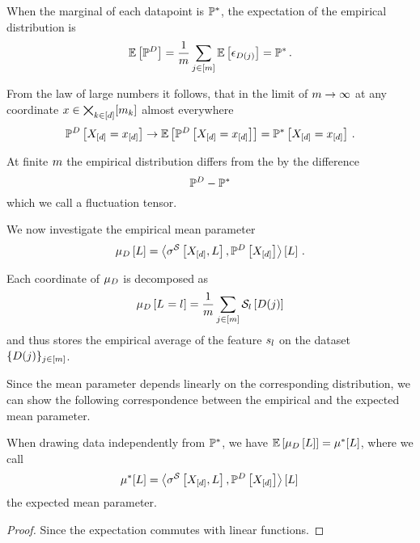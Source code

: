 When the marginal of each datapoint is $\mathbb{P}^*$, the expectation of the empirical distribution is
\begin{align*}
    \mathbb{E}\left[\mathbb{P}^{D}\right]
    = \frac{1}{m} \sum_{j\in[m]}  \mathbb{E}\left[\epsilon_{D(j)}\right]
    = \mathbb{P}^* \, .
\end{align*}

From the law of large numbers it follows, that in the limit of $m\rightarrow\infty$ at any coordinate $x\in\bigtimes_{k\in[d]}[m_{k}]$ almost everywhere
\[ \mathbb{P}^{D}\left[X_{[d]}=x_{[d]}\right] \rightarrow \mathbb{E}\left[\mathbb{P}^{D}\left[X_{[d]}=x_{[d]}\right]\right] =  \mathbb{P}^*\left[X_{[d]}=x_{[d]}\right] \, . \]

At finite $m$ the empirical distribution differs from the by the difference
\[ \mathbb{P}^{D} - \mathbb{P}^* \]
which we call a fluctuation tensor.


We now investigate the empirical mean parameter
\[
    \mu_{D}\left[L\right] = \left\langle \sigma^{\mathcal{S}}\left[X_{[d]},L\right],\mathbb{P}^{D}\left[X_{[d]}\right]\right\rangle \left[ L \right] \, .
\]

Each coordinate of $\mu_{D}$ is decomposed as
\[ \mu_{D}\left[L_{}=l_{}\right] = \frac{1}{m}\sum_{j\in[m]} \mathcal{S}_{l}\left[D(j)\right] \]
and thus stores the empirical average of the feature $s_{l}$ on the dataset $\{D(j)\}_{j\in[m]}$.

Since the mean parameter depends linearly on the corresponding distribution, we can show the following correspondence between the empirical and the expected mean parameter.

\begin{theorem}
    \label{the:expectedMeanParameter}
    When drawing data independently from $\mathbb{P}^*$, we have $\mathbb{E}\left[\mu_{D}\left[L\right]\right]=\mu^*[L]$, where we call
    \[
        \mu^*[L] = \left\langle \sigma^{\mathcal{S}}\left[X_{[d]},L\right],\mathbb{P}^{D}\left[X_{[d]}\right]\right\rangle \left[ L \right] \,
    \]
    the expected mean parameter.
\end{theorem}
\begin{proof}
    Since the expectation commutes with linear functions.
\end{proof}


